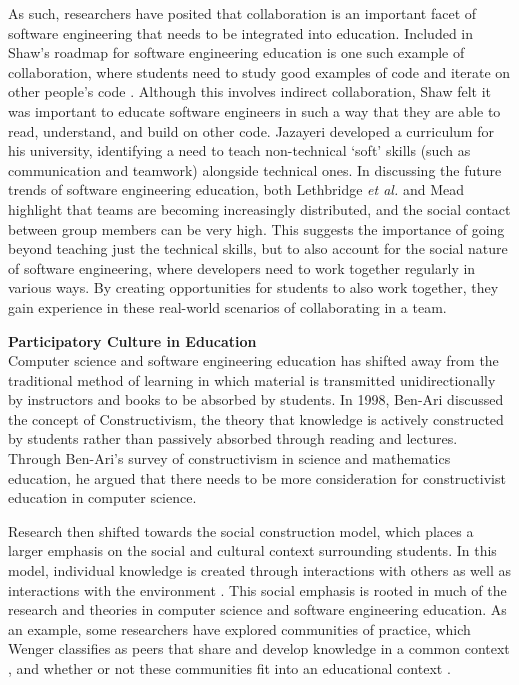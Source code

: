 As such, researchers have posited that collaboration is an important facet of software engineering that needs to be integrated into education. Included in Shaw's roadmap for software engineering education is one such example of collaboration, where students need to study good examples of code and iterate on other people's code \cite{shaw2000software}. Although this involves indirect collaboration, Shaw felt it was important to educate software engineers in such a way that they are able to read, understand, and build on other code. Jazayeri \cite{jazayeri2004education} developed a curriculum for his university, identifying a need to teach non-technical `soft' skills (such as communication and teamwork) alongside technical ones. In discussing the future trends of software engineering education, both Lethbridge \textit{et al.} \cite{lethbridge2007improving} and Mead \cite{mead2009software} highlight that teams are becoming increasingly distributed, and the social contact between group members can be very high. This suggests the importance of going beyond teaching just the technical skills, but to also account for the social nature of software engineering, where developers need to work together regularly in various ways. By creating opportunities for students to also work together, they gain experience in these real-world scenarios of collaborating in a team.


\textbf{Participatory Culture in Education} \\
Computer science and software engineering education has shifted away from the traditional method of learning in which material is transmitted unidirectionally by instructors and books to be absorbed by students. In 1998, Ben-Ari \cite{ben1998constructivism} discussed the concept of Constructivism, the theory that knowledge is actively constructed by students rather than passively absorbed through reading and lectures. Through Ben-Ari's survey of constructivism in science and mathematics education, he argued that there needs to be more consideration for constructivist education in computer science.

Research then shifted towards the social construction model, which places a larger emphasis on the social and cultural context surrounding students. In this model, individual knowledge is created through interactions with others as well as interactions with the environment \cite{kim2001social}. This social emphasis is rooted in much of the research and theories in computer science and software engineering education. As an example, some researchers have explored communities of practice, which Wenger classifies as peers that share and develop knowledge in a common context \cite{wenger1998communities}, and whether or not these communities fit into an educational context \cite{ben2004situated}.

